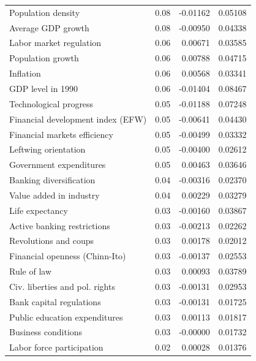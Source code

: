 \documentclass[a4paper,11pt]{article}
\begin{document}
\begin{table}[!ht]
\begin{tabular}{lrrr}
  Population density & 0.08 & -0.01162 & 0.05108 \\ 
  Average GDP growth & 0.08 & -0.00950 & 0.04338 \\ 
  Labor market regulation & 0.06 & 0.00671 & 0.03585 \\ 
  Population growth & 0.06 & 0.00788 & 0.04715 \\ 
  Inflation & 0.06 & 0.00568 & 0.03341 \\ 
  GDP level in 1990 & 0.06 & -0.01404 & 0.08467 \\ 
  Technological progress & 0.05 & -0.01188 & 0.07248 \\ 
  Financial development index (EFW) & 0.05 & -0.00641 & 0.04430 \\ 
  Financial markets efficiency & 0.05 & -0.00499 & 0.03332 \\ 
  Leftwing orientation & 0.05 & -0.00400 & 0.02612 \\ 
  Government expenditures & 0.05 & 0.00463 & 0.03646 \\ 
  Banking diversification & 0.04 & -0.00316 & 0.02370 \\ 
  Value added in industry & 0.04 & 0.00229 & 0.03279 \\ 
  Life expectancy & 0.03 & -0.00160 & 0.03867 \\ 
  Active banking restrictions & 0.03 & -0.00213 & 0.02262 \\ 
  Revolutions and coups & 0.03 & 0.00178 & 0.02012 \\ 
  Financial openness (Chinn-Ito) & 0.03 & -0.00137 & 0.02553 \\ 
  Rule of law & 0.03 & 0.00093 & 0.03789 \\ 
  Civ. liberties and pol. rights & 0.03 & -0.00131 & 0.02953 \\ 
  Bank capital regulations & 0.03 & -0.00131 & 0.01725 \\ 
  Public education expenditures & 0.03 & 0.00113 & 0.01817 \\ 
  Business conditions & 0.03 & -0.00000 & 0.01732 \\ 
  Labor force participation & 0.02 & 0.00028 & 0.01376 \\  
  \midrule
  \bottomrule
\end{tabular}
\end{table}

\clearpage
\end{document}

